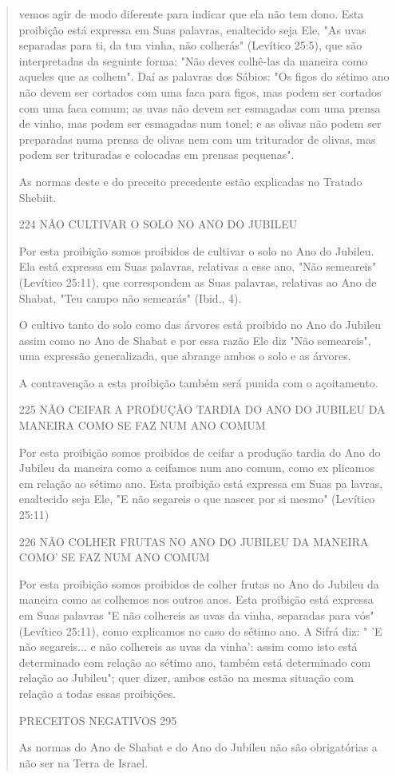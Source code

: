 \begin{quote}vemos agir de modo diferente para indicar que ela 
não tem dono. Esta
proibi­ção está expressa em Suas palavras, enaltecido seja Ele, "As uvas
separadas para ti, da tua vinha, não colherás" (Levítico 25:5), que são
interpretadas da seguin­te forma: "Não deves colhê-las da maneira como
aqueles que as colhem". Daí as palavras dos Sábios: "Os figos do sétimo
ano não devem ser cortados com uma faca para figos, mas podem ser
cortados com uma faca comum; as uvas não devem ser esmagadas com uma
prensa de vinho, mas podem ser esmaga­das num tonel; e as olivas não
podem ser preparadas numa prensa de olivas nem com um triturador de
olivas, mas podem ser trituradas e colocadas em prensas pequenas".

As normas deste e do preceito precedente estão explicadas no Tra­tado
Shebiit.

224 NÃO CULTIVAR O SOLO NO ANO DO JUBILEU

Por esta proibição somos proibidos de cultivar o solo no Ano do
Ju­bileu. Ela está expressa em Suas palavras, relativas a esse ano, "Não
semeareis" (Levítico 25:11), que correspondem as Suas palavras,
relativas ao Ano de Sha­bat, "Teu campo não semearás" (Ibid., 4).

O cultivo tanto do solo como das árvores está proibido no Ano do Jubileu
assim como no Ano de Shabat e por essa razão Ele diz "Não semeareis",
uma expressão generalizada, que abrange ambos o solo e as árvores.

A contravenção a esta proibição também será punida com o açoitamento.

225 NÃO CEIFAR A PRODUÇÃO TARDIA DO ANO DO JUBILEU DA MANEIRA COMO SE
FAZ NUM ANO COMUM

Por esta proibição somos proibidos de ceifar a produção tardia do Ano do
Jubileu da maneira como a ceifamos num ano comum, como ex plicamos em
relação ao sétimo ano. Esta proibição está expressa em Suas pa lavras,
enaltecido seja Ele, "E não segareis o que nascer por si mesmo"
(Leví­tico 25:11)

226 NÃO COLHER FRUTAS NO ANO DO JUBILEU DA MANEIRA COMO' SE FAZ NUM ANO
COMUM

Por esta proibição somos proibidos de colher frutas no Ano do Jubileu da
maneira como as colhemos nos outros anos. Esta proibição está expressa
em Suas palavras "E não colhereis as uvas da vinha, separadas para vós"
(Levítico 25:11), como explicamos no caso do sétimo ano. A Sifrá diz: "
'E não segareis... e não colhereis as uvas da vinha': assim como isto
está determinado com relação ao sétimo ano, também está determinado com
rela­ção ao Jubileu"; quer dizer, ambos estão na mesma situação com
relação a todas essas proibições.

PRECEITOS NEGATIVOS 295

As normas do Ano de Shabat e do Ano do Jubileu não são obrigató­rias a
não ser na Terra de Israel.
\end{quote}

